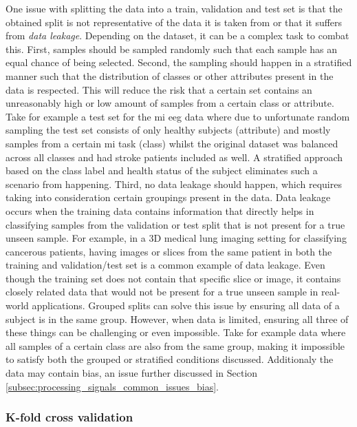 One issue with splitting the data into a train, validation and test set is that the obtained split is not representative of the data it is taken from or that it suffers from \textit{data leakage}.
Depending on the dataset, it can be a complex task to combat this.
First, samples should be sampled randomly such that each sample has an equal chance of being selected.
Second, the sampling should happen in a stratified manner such that the distribution of classes or other attributes present in the data is respected.
This will reduce the risk that a certain set contains an unreasonably high or low amount of samples from a certain class or attribute.
Take for example a test set for the \gls{mi} \gls{eeg} data where due to unfortunate random sampling the test set consists of only healthy subjects (attribute) and mostly samples from a certain \gls{mi} task (class) whilst the original dataset was balanced across all classes and had stroke patients included as well.
A stratified approach based on the class label and health status of the subject eliminates such a scenario from happening.
Third, no data leakage should happen, which requires taking into consideration certain groupings present in the data.
Data leakage occurs when the training data contains information that directly helps in classifying samples from the validation or test split that is not present for a true unseen sample.
For example, in a 3D medical lung imaging setting for classifying cancerous patients, having images or slices from the same patient in both the training and validation/test set is a common example of data leakage.
Even though the training set does not contain that specific slice or image, it contains closely related data that would not be present for a true unseen sample in real-world applications.
Grouped splits can solve this issue by ensuring all data of a subject is in the same group.
However, when data is limited, ensuring all three of these things can be challenging or even impossible.
Take for example data where all samples of a certain class are also from the same group, making it impossible to satisfy both the grouped or stratified conditions discussed.
Additionaly the data may contain bias, an issue further discussed in Section \ref{subsec:processing_signals_common_issues_bias}.



\subsubsection{K-fold cross validation}
\label{subsubsec:processing_signals_evaluating_and_using_evaluation_kfold}


